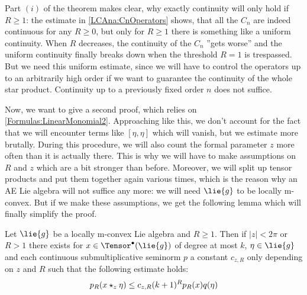 \begin{remark}
	Part $(i)$ of the theorem makes clear, why exactly continuity will 
	only hold if $R \geq 1$: the estimate in \eqref{LCAna:CnOperators} shows, 
	that all the $C_n$ are indeed continuous for any $R \geq 0$, but only 
	for $R \geq 1$ there is something like a uniform continuity. When $R$ 
	decreases, the continuity of the $C_n$ ''gets worse'' and the uniform 
	continuity finally breaks down when the threshold $R = 1$ is trespassed. 
	But we need this uniform estimate, since we will have to control the 
	operators up to an arbitrarily high order if we want to guarantee the 
	continuity of the whole star product. Continuity up to a previously fixed
	order $n$ does not suffice.
\end{remark}


Now, we want to give a second proof, which relies on 
\eqref{Formulas:LinearMonomial2}. Approaching like this, we don't account for 
the fact that we will encounter terms like $[\eta, \eta]$ which will vanish, 
but we estimate more brutally. During this procedure, we will also count the 
formal parameter $z$ more often than it is actually there. This is why we will 
have to make assumptions on $R$ and $z$ which are a bit stronger than before. 
Moreover, we will split up tensor products and put them together again various 
times, which is the reason why an AE Lie algebra will not suffice any more: we 
will need $\lie{g}$ to be locally m-convex. But if we make these assumptions, 
we get the following lemma which will finally simplify the proof.
\begin{lemma}
    \label{LCAna:Lemma:PreContinuity2}%
    Let $\lie{g}$ be a locally m-convex Lie algebra and $R \geq1$. 
    Then if $|z| < 2 \pi$ or $R >1$ there exists for $x \in
    \Tensor^{\bullet}(\lie{g})$ of degree at most $k$, $\eta \in \lie{g}$
    and each continuous submultiplicative seminorm $p$ a constant $c_{z,R}$ 
    only depending on $z$ and $R$ such that the following estimate holds:
    \begin{equation}
        \label{LCAna:PreContinuity2}
        p_R(x \star_z \eta)
        \leq
        c_{z,R} (k+1)^R p_R(x) q(\eta)
    \end{equation}
\end{lemma}
